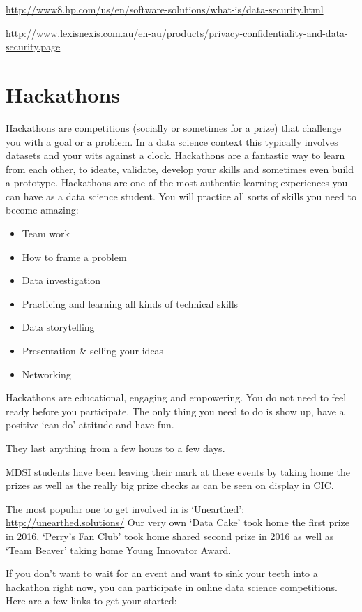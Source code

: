 \documentclass[]{book}
\providecommand{\tightlist}{%
  \setlength{\itemsep}{0pt}\setlength{\parskip}{0pt}}
\theoremstyle{definition}
\theoremstyle{definition}
\theoremstyle{remark}
\begin{document}
\url{http://www8.hp.com/us/en/software-solutions/what-is/data-security.html}

\url{http://www.lexisnexis.com.au/en-au/products/privacy-confidentiality-and-data-security.page}

\section{Hackathons}\label{hackathons}

Hackathons are competitions (socially or sometimes for a prize) that
challenge you with a goal or a problem. In a data science context this
typically involves datasets and your wits against a clock. Hackathons
are a fantastic way to learn from each other, to ideate, validate,
develop your skills and sometimes even build a prototype. Hackathons are
one of the most authentic learning experiences you can have as a data
science student. You will practice all sorts of skills you need to
become amazing:

\begin{itemize}
\tightlist
\item
  Team work
\item
  How to frame a problem
\item
  Data investigation
\item
  Practicing and learning all kinds of technical skills
\item
  Data storytelling
\item
  Presentation \& selling your ideas
\item
  Networking
\end{itemize}

Hackathons are educational, engaging and empowering. You do not need to
feel ready before you participate. The only thing you need to do is show
up, have a positive `can do' attitude and have fun.

They last anything from a few hours to a few days.

MDSI students have been leaving their mark at these events by taking
home the prizes as well as the really big prize checks as can be seen on
display in CIC.

The most popular one to get involved in is `Unearthed':
\url{http://unearthed.solutions/} Our very own `Data Cake' took home the
first prize in 2016, `Perry's Fan Club' took home shared second prize in
2016 as well as `Team Beaver' taking home Young Innovator Award.

If you don't want to wait for an event and want to sink your teeth into
a hackathon right now, you can participate in online data science
competitions. Here are a few links to get your started:
\end{document}
